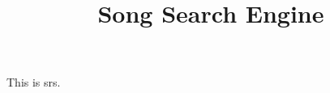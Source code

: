 \documentclass[12pt]{article}
\title{Song Search Engine}
\begin{document}
This is srs.
\end{document}
